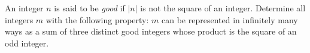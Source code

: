 An integer $n$ is said to be \emph{good} if $|n|$ is not the square of an integer. Determine all integers $m$ with the following property: $m$ can be represented in infinitely many ways as a sum of three distinct good integers whose product is the square of an odd integer.

